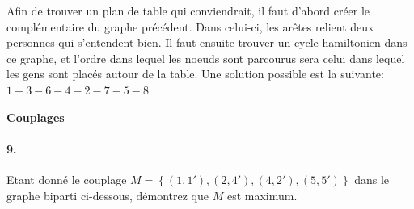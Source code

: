 \begin{figure}[h!]
  \begin{center}
  \end{center}
\end{figure}

\begin{solution}
Afin de trouver un plan de table qui conviendrait, il faut d'abord créer le complémentaire du graphe précédent. Dans celui-ci, les arêtes relient deux personnes qui s'entendent bien. Il faut ensuite trouver un cycle hamiltonien dans ce graphe, et l'ordre dans lequel les noeuds sont parcourus sera celui dans lequel les gens sont placés autour de la table. Une solution possible est la suivante:$1-3-6-4-2-7-5-8$
\end{solution}

\newpage

\textbf{Couplages}

\paragraph{9. } Etant donné le couplage $M = \left\lbrace  (1,1'), (2,4'),(4,2'),(5,5')  \right\rbrace$ dans le graphe biparti ci-dessous, démontrez que $M$ est maximum.

